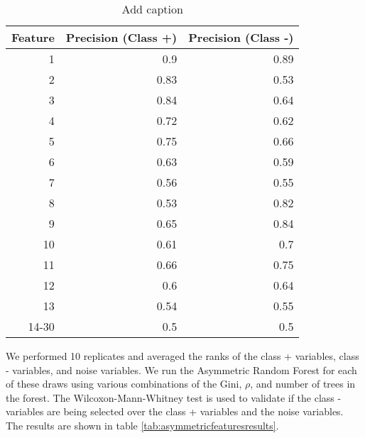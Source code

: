 \documentclass[twoside,11pt]{article}
\begin{document}
\begin{table}[htbp]
  \centering
  \caption{Add caption}
    \begin{tabular}{rrr}
    \hline
    Feature & Precision (Class +) & Precision (Class -) \bigstrut\\
    \hline
    1     & 0.9   & 0.89 \bigstrut[t]\\
    2     & 0.83  & 0.53 \\
    3     & 0.84  & 0.64 \\
    4     & 0.72  & 0.62 \\
    5     & 0.75  & 0.66 \\
    6     & 0.63  & 0.59 \\
    7     & 0.56  & 0.55 \\
    8     & 0.53  & 0.82 \\
    9     & 0.65  & 0.84 \\
    10    & 0.61  & 0.7 \\
    11    & 0.66  & 0.75 \\
    12    & 0.6   & 0.64 \\
    13    & 0.54  & 0.55 \\
    14-30 & 0.5   & 0.5 \bigstrut[b]\\
    \hline
    \end{tabular}%
  \label{tab:asymmetricfeatures1}%
\end{table}%

We performed 10 replicates and averaged the ranks of the class + variables, class - variables, and noise variables. We run the Asymmetric Random Forest for each of these draws using various combinations of the Gini, $\rho$, and number of trees in the forest. The Wilcoxon-Mann-Whitney test is used to validate if the class - variables are being selected over the class + variables and the noise variables. The results are shown in table \ref{tab:asymmetricfeaturesresults}.


\end{document}

